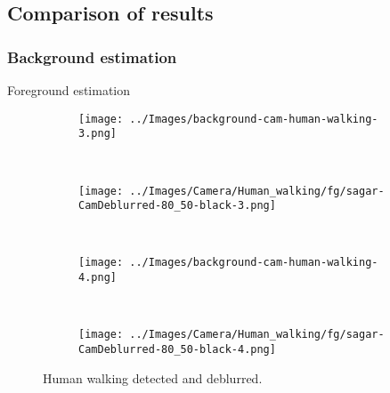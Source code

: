 \subsection{Comparison of results}
\begin{frame}
  \frametitle{Background estimation}
\end{frame}

\begin{frame}[allowframebreaks]{Foreground estimation}

\begin{figure}
\begin{subfigure}{0.4\textwidth}
\texttt{[image: ../Images/background-cam-human-walking-3.png]}
\end{subfigure}
~
\begin{subfigure}{0.4\textwidth}
\texttt{[image: ../Images/Camera/Human\_walking/fg/sagar-CamDeblurred-80\_50-black-3.png]}
\end{subfigure}
~
\begin{subfigure}{0.4\textwidth}
\texttt{[image: ../Images/background-cam-human-walking-4.png]}
\end{subfigure}
~
\begin{subfigure}{0.4\textwidth}
\texttt{[image: ../Images/Camera/Human\_walking/fg/sagar-CamDeblurred-80\_50-black-4.png]}
\end{subfigure}
\caption{Human walking detected and deblurred.}
\label{fig:DetectHuman}
\end{figure}

\end{frame}

